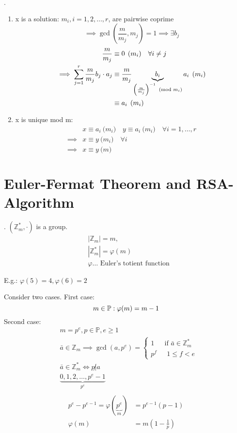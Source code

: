\Proof.

\begin{enumerate}[1)]

  \item x is a solution: $m_i, i = 1,2, \ldots, r$, are pairwise coprime
  \[
    \implies \gcd\left(\frac{m}{m_j}, m_j\right) = 1 \implies \exists b_j
  \]
  \begin{align*}
    \frac{m}{m_j} &\equiv 0 \pod{m_i} \quad \forall i \neq j \\
    \implies \sum_{j=1}^{r}\frac{m}{m_j} b_j \cdot a_j &\equiv
      \frac{m}{m_j} \underbrace{b_i}_{\left(\frac{m}{m_j}\right)^{-1} \imod{m_i}} a_i \pod{m_i} \\
    &\equiv a_i \pod{m_i}
  \end{align*}

  \item x is unique mod m:
  \begin{align*}
    & x \equiv a_i\pod{m_i} \quad y \equiv a_i \pod{m_i} \quad \forall i = 1,\ldots, r \\
    \implies & x \equiv y \pod{m_i} \quad \forall i \\
    \implies & x \equiv y \pod{m}
  \end{align*}

\end{enumerate}

\section{Euler-Fermat Theorem and RSA-Algorithm}

\Theorem.
$(\mathbb{Z}_m^{*}, \cdot)$ is a group.
\begin{align*}
  &|\mathbb{Z}_m| = m, \\
  &|\mathbb{Z}_m^{*}| = \varphi(m) \\
  &\varphi \ldots \text{ Euler's totient function}
\end{align*}

E.g.: $\varphi(5) = 4, \varphi(6) = 2$

Consider two cases. First case:
\[
  m \in \mathbb{P}: \varphi(m) = m-1 \\
\]
Second case:
\begin{align*}
  &m = p^e, p \in \mathbb{P}, e \geq 1 \\
  &\bar{a}\in \mathbb{Z}_m \implies \gcd(a,p^e) = \begin{cases}
    1   &\text{ if $\bar{a} \in \mathbb{Z}_m^{*}$} \\
    p^f &\text{ $1 \leq f < e$}
  \end{cases} \\
  &\bar{a}\in \mathbb{Z}_m^{*} \Leftrightarrow p \not|a \\
  & \underbrace{0,1,2, \ldots, p^e -1}_{p^e}\\
\end{align*}\vspace{-1.5cm}
\begin{align*}
  p^e - p^{e-1} = \varphi(\underbrace{p^e}_{m}) &= p^{e-1}(p-1) \\
                \varphi(m) &= m\left(1-\frac{1}{p}\right)
\end{align*}

